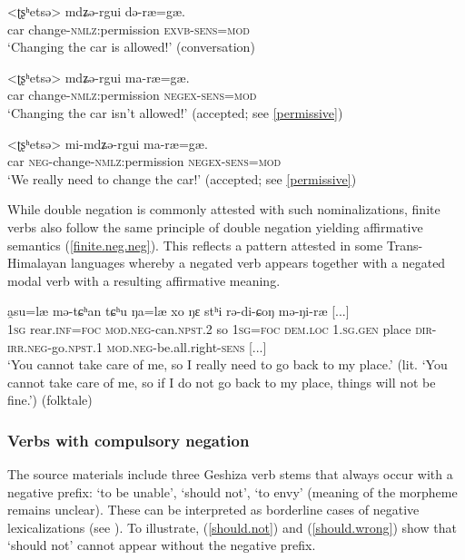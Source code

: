 \documentclass[output=paper,colorlinks,citecolor=brown]{langscibook}
\begin{document}
\ea
\label{permissive}
\gll  <{ʈʂʰetsə}> {mdʑə-rgui} {də-ræ=gæ}.\\ 
car		change-\textsc{nmlz}:permission \textsc{exvb-sens=mod}\\
\glt `Changing the car is allowed!' (conversation)
\z

\ea
\label{permissive.neg}
\gll  <{ʈʂʰetsə}> {mdʑə-rgui} {ma-ræ=gæ}.\\ 
car		change-\textsc{nmlz}:permission \textsc{negex-sens=mod}\\
\glt `Changing the car isn't allowed!' (accepted; see \ref{permissive})
\z

\ea
\label{permissive.neg.neg}
\gll  <{ʈʂʰetsə}> {mi-mdʑə-rgui} {ma-ræ=gæ}.\\
car		\textsc{neg}-change-\textsc{nmlz}:permission \textsc{negex-sens=mod}\\
\glt `We really need to change the car!' (accepted; see \ref{permissive})
\z

While double negation is commonly attested with such nominalizations, finite verbs also follow the same principle of double negation yielding affirmative semantics (\ref{finite.neg.neg}). This reflects a pattern attested in some Trans-Himalayan languages whereby a negated verb appears together with a negated modal verb with a resulting affirmative meaning. 

\ea
\label{finite.neg.neg}
 {a̯su=læ} {mə-tɕʰan} {tɕʰu} {ŋa=læ} {xo} {ŋɛ} {stʰi} {rə-di-ɕoŋ} {mə-ŋi-ræ} 	[...]\\
\textsc{1sg}    rear.\textsc{inf}=\textsc{foc} \textsc{mod.neg}-can.\textsc{npst}.2 so \textsc{1sg=foc} \textsc{dem.loc} \textsc{1.sg.gen} place \textsc{dir-irr.neg}-go.\textsc{npst}.1 \textsc{mod.neg}-be.all.right-\textsc{sens} [...]\\		
\glt `You cannot take care of me, so I really need to go back to my place.' (lit. `You cannot take care of me, so if I do not go back to my place, things will not be fine.') (folktale)
\z

\subsubsection{Verbs with compulsory negation}
\label{compneg}
The source materials include three Geshiza verb stems that always occur with a negative prefix:  ‘to be unable’,  ‘should not’,  ‘to envy’ (meaning of the morpheme  remains unclear). These can be interpreted as borderline cases of negative lexicalizations (see ). To illustrate, (\ref{should.not}) and (\ref{should.wrong}) show that  ‘should not’ cannot appear without the negative prefix.
\end{document}

